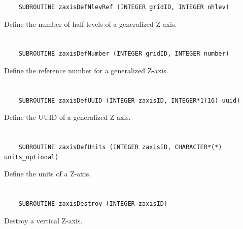 \begin{verbatim}
    SUBROUTINE zaxisDefNlevRef (INTEGER gridID, INTEGER nhlev)
\end{verbatim}

Define the number of half levels of a generalized Z-axis.


\section*{\tt {}}

\begin{verbatim}
    SUBROUTINE zaxisDefNumber (INTEGER gridID, INTEGER number)
\end{verbatim}

Define the reference number for a generalized Z-axis.


\section*{\tt {}}

\begin{verbatim}
    SUBROUTINE zaxisDefUUID (INTEGER zaxisID, INTEGER*1(16) uuid)
\end{verbatim}

Define the UUID of a generalized Z-axis.


\section*{\tt {}}

\begin{verbatim}
    SUBROUTINE zaxisDefUnits (INTEGER zaxisID, CHARACTER*(*) units_optional)
\end{verbatim}

Define the units of a Z-axis.


\section*{\tt {}}

\begin{verbatim}
    SUBROUTINE zaxisDestroy (INTEGER zaxisID)
\end{verbatim}

Destroy a vertical Z-axis.


\section*{\tt {}}

